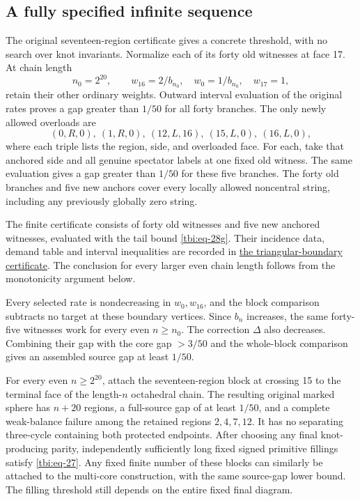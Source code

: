 \subsection{A fully specified infinite sequence}\label{a-fully-specified-infinite-sequence}

The original seventeen-region certificate gives a concrete threshold, with no search over knot invariants. Normalize each of its forty old witnesses at face 17. At chain length
\begin{equation}\label{tbi:eq-35}
n_0=2^{20},\qquad
w_{16}=2/b_{n_0},\quad w_0=1/b_{n_0},\quad w_{17}=1,
\end{equation}
retain their other ordinary weights. Outward interval evaluation of the original rates proves a gap greater than \(1/50\) for all forty branches. The only newly allowed overloads are
\begin{equation}\label{tbi:eq-36}
(0,R,0),\ (1,R,0),\ (12,L,16),\ (15,L,0),\ (16,L,0),
\end{equation}
where each triple lists the region, side, and overloaded face. For each, take that anchored side and all genuine spectator labels at one fixed old witness. The same evaluation gives a gap greater than \(1/50\) for these five branches. The forty old branches and five new anchors cover every locally allowed noncentral string, including any previously globally zero string.

The finite certificate consists of forty old witnesses and five new
anchored witnesses, evaluated with the tail bound
\eqref{tbi:eq-28g}. Their incidence data, demand table and interval
inequalities are recorded in
\href{https://github.com/sashakolpakov/murakamis_dream/blob/main/repro/check_triangular_boundary_certificate.py}{the triangular-boundary certificate}.
The conclusion for every larger even chain length follows from the
monotonicity argument below.

Every selected rate is nondecreasing in \(w_0,w_{16}\), and the block comparison subtracts no target at these boundary vertices. Since \(b_n\) increases, the same forty-five witnesses work for every even \(n\ge n_0\). The correction \(\Delta\) also decreases. Combining their gap with the core gap \(>3/50\) and the whole-block comparison gives an assembled source gap at least \(1/50\).

\begin{corollary}\label{tbi:explicit} For every even \(n\ge2^{20}\), attach the seventeen-region block at crossing 15 to the terminal face of the length-\(n\) octahedral chain. The resulting original marked sphere has \(n+20\) regions, a full-source gap of at least \(1/50\), and a complete weak-balance failure among the retained regions \(2,4,7,12\). It has no separating three-cycle containing both protected endpoints. After choosing any final knot-producing parity, independently sufficiently long fixed signed primitive fillings satisfy \eqref{tbi:eq-27}. Any fixed finite number of these blocks can similarly be attached to the multi-core construction, with the same source-gap lower bound. The filling threshold still depends on the entire fixed final diagram.
\end{corollary}

